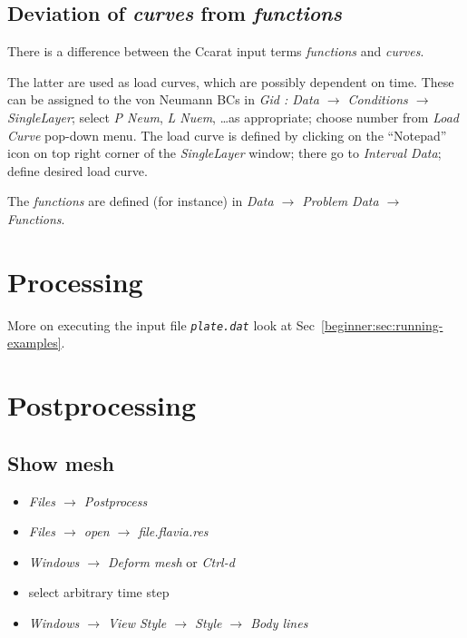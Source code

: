 \subsection{Deviation of \emph{curves} from \emph{functions}}

There is a difference between the Ccarat input terms \emph{functions}
and \emph{curves}.

The latter are used as load curves, which are possibly dependent on
time. These can be assigned to the von Neumann BCs in \emph{Gid :
Data $\rightarrow$ Conditions $\rightarrow$ SingleLayer}; select
\emph{P Neum}, \emph{L Nuem}, \ldots{}as appropriate; choose number
from \emph{Load Curve} pop-down menu. The load curve is defined by
clicking on the {}``Notepad'' icon on top right corner of the \emph{SingleLayer}
window; there go to \emph{Interval Data}; define desired load curve.

The \emph{functions} are defined (for instance) in \emph{Data $\rightarrow$
Problem Data $\rightarrow$ Functions}.


\section{Processing}

More on executing the input file \texttt{\emph{plate.dat}} look at
Sec~\ref{beginner:sec:running-examples}. 


\section{Postprocessing}\label{tut_struct:sec:postprocessing}


\subsection{Show mesh}

\label{sec:show-grid}

\begin{itemize}
\item \emph{Files $\rightarrow$ Postprocess}
\item \emph{Files $\rightarrow$ open $\rightarrow$ file.flavia.res}
\item \emph{Windows $\rightarrow$ Deform mesh} or \emph{Ctrl-d}
\item select arbitrary time step 
\item \emph{Windows $\rightarrow$ View Style $\rightarrow$ Style $\rightarrow$
Body lines}
\end{itemize}


